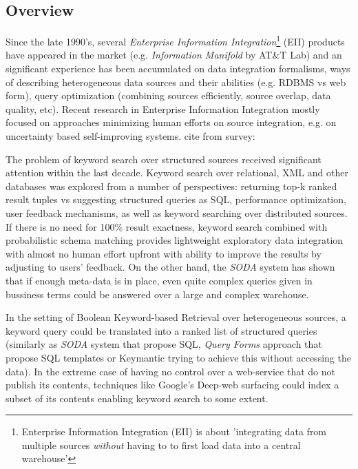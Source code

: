 
\subsection{Overview}


Since the late 1990's, several \textit{Enterprise Information Integration}\footnote{%
	Enterprise Information Integration (EII) is about 'integrating data from 
	multiple sources 	\textit{without} having to to first load data into
	 a central warehouse'\cite[p.1]{eii_2005}}
 (EII) products have appeared in the market (e.g. \textit{Information Manifold} by AT\&T Lab) and an significant experience has been accumulated on data integration formalisms, ways of describing heterogeneous data sources and their abilities (e.g. RDBMS vs web form), query optimization (combining sources efficiently, source overlap, data quality, etc)\cite{eii_2005}. 
%
Recent research in  Enterprise Information Integration mostly focused on approaches minimizing  human efforts on source integration, e.g. on uncertainty based self-improving systems\cite[ch.19]{principles_data_integration}.  {\color{red} cite from survey: \cite{IIHet_survey08}}

The problem of keyword search over structured sources received significant attention within the last decade. Keyword search over relational, XML and other databases was explored from a number of perspectives: returning top-k ranked result tuples vs suggesting structured queries as SQL, performance optimization, user feedback mechanisms, as well as keyword searching over distributed sources. 
%
If there is no need for 100\% result exactness, keyword search combined with probabilistic schema matching provides lightweight exploratory data integration with almost no human effort upfront with ability to improve the results by adjusting to users' feedback\cite[ch.16]{principles_data_integration}. On the other hand, the \textit{SODA} system has shown that if enough meta-data is in place, even quite complex queries given in bussiness terms could be answered over a large and complex warehouse.

In the setting of Boolean Keyword-based Retrieval over heterogeneous sources, a keyword query could be translated into a ranked list of structured queries (similarly as \textit{SODA} system that propose SQL, \textit{Query Forms} approach that propose SQL templates or Keymantic trying to achieve this without accessing the data).
In the extreme case of having no control over a web-service that do not publish its contents, techniques like Google's Deep-web surfacing could index a subset of its contents enabling keyword search to some extent.



